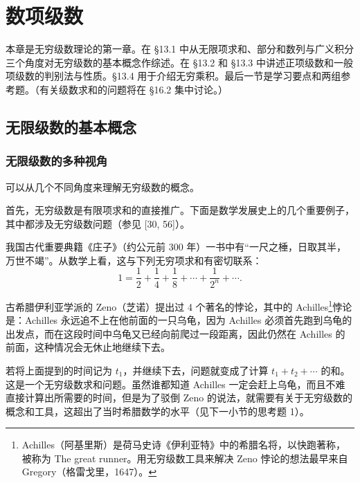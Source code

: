 \chapter{数项级数}

本章是无穷级数理论的第一章。在 §13.1 中从无限项求和、部分和数列与广义积分三个角度对无穷级数的基本概念作综述。在 §13.2 和 §13.3 中讲述正项级数和一般项级数的判别法与性质。§13.4 用于介绍无穷乘积。最后一节是学习要点和两组参考题。（有关级数求和的问题将在 §16.2 集中讨论。）

\section{无限级数的基本概念}

\subsection{无限级数的多种视角}

可以从几个不同角度来理解无穷级数的概念。

首先，无穷级数是有限项求和的直接推广。下面是数学发展史上的几个重要例子，其中都涉及无穷级数问题（参见 [30, 56]）。

\begin{xexample}[13.1.1]
我国古代重要典籍《庄子》（约公元前 300 年）一书中有“一尺之棰，日取其半，万世不竭”。从数学上看，这与下列无穷项求和有密切联系：
\[
1=\frac12+\frac14+\frac18+\cdots+\frac1{2^n}+\cdots.
\]
\end{xexample}

\begin{xexample}[13.1.2]
古希腊伊利亚学派的 Zeno（芝诺）提出过 4 个著名的悖论，其中的 Achilles\footnote{Achilles（阿基里斯）是荷马史诗《伊利亚特》中的希腊名将，以快跑著称，被称为 The great runner。用无穷级数工具来解决 Zeno 悖论的想法最早来自 Gregory（格雷戈里，1647）。}悖论是：Achilles 永远追不上在他前面的一只乌龟，因为 Achilles 必须首先跑到乌龟的出发点，而在这段时间中乌龟又已经向前爬过一段距离，因此仍然在 Achilles 的前面，这种情况会无休止地继续下去。

若将上面提到的时间记为 $t_1$，并继续下去，问题就变成了计算 $t_1+t_2+\cdots$ 的和。这是一个无穷级数求和问题。虽然谁都知道 Achilles 一定会赶上乌龟，而且不难直接计算出所需要的时间，但是为了驳倒 Zeno 的说法，就需要有关于无穷级数的概念和工具，这超出了当时希腊数学的水平（见下一小节的思考题 1）。
\end{xexample}

